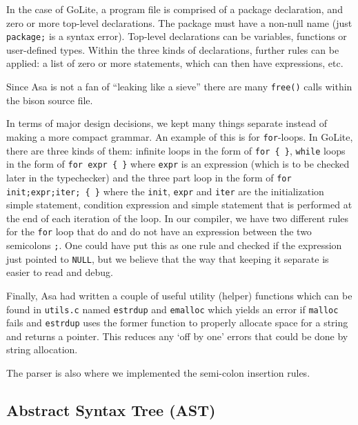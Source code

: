 \documentclass{article}
\begin{document}
In the case of GoLite, a program file is comprised of a package declaration, and zero or more top-level declarations. The package must have a non-null name (just \texttt{package;} is a syntax error). Top-level declarations can be variables, functions or user-defined types. Within the three kinds of declarations, further rules can be applied: a list of zero or more statements, which can then have expressions, etc. 

Since Asa is not a fan of ``leaking like a sieve'' there are many \texttt{free()} calls within the bison source file.

In terms of major design decisions, we kept many things separate instead of making a more compact grammar. An example of this is for \texttt{for}-loops. In GoLite, there are three kinds of them: infinite loops in the form of \texttt{for \{ \}}, \texttt{while} loops in the form of \texttt{for expr  \{ \}} where \texttt{expr} is an expression (which is to be checked later in the typechecker) and the three part loop in the form of \texttt{for init;expr;iter; \{ \}} where the \texttt{init}, \texttt{expr} and \texttt{iter} are the initialization simple statement, condition expression and simple statement that is performed at the end of each iteration of the loop. In our compiler, we have two different rules for the \texttt{for} loop that do and do not have an expression between the two semicolons \texttt{;}. One could have put this as one rule and checked if the expression just pointed to \texttt{NULL}, but we believe that the way that keeping it separate is easier to read and debug.

Finally, Asa had written a couple of useful utility (helper) functions which can be found in \texttt{utils.c} named \texttt{estrdup} and \texttt{emalloc} which yields an error if \texttt{malloc} fails and \texttt{estrdup} uses the former function to properly allocate space for a string and returns a pointer. This reduces any `off by one' errors that could be done by string allocation. 

The parser is also where we implemented the semi-colon insertion rules. 

\subsection{Abstract Syntax Tree (AST)}
\end{document}
